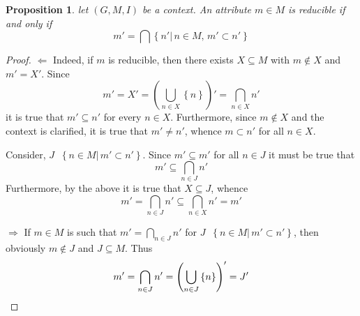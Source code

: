 \documentclass[a4paper]{article}
\newcommand{\obj}[1]{{\left\{ #1 \right \}}}
\newcommand{\brac}[1]{{\left ( #1 \right )}}
\newcommand{\induc}[1]{{\left . #1 \right \vert}}
\newtheorem{prop}{Proposition}
\newcommand{\defn}{\mathop{\overset{\Delta}{=}}\nolimits}
\begin{document}
\begin{prop} let $(G,M,I)$ be a context. An attribute $m\in M$ is reducible if and only if \[m' = \bigcap \obj{\induc{n'}\,n\in M,\,m'\subset n'}\]
\end{prop}

\begin{proof}
$\Leftarrow$ Indeed, if $m$ is reducible, then there exists $X\subseteq M$ with $m\notin X$ and $m'=X'$. Since \[m' = X' = \brac{\bigcup_{n\in X} \obj{n}}' = \bigcap_{n\in X} n'\] it is true that $m'\subseteq n'$ for every $n\in X$. Furthermore, since $m\notin X$ and the context is clarified, it is true that $m'\neq n'$, whence $m\subset n'$ for all $n\in X$.

Consider, $J\defn \obj{\induc{n\in M}\,m'\subset n'}$. Since $m'\subseteq m'$ for all $n\in J$ it must be true that \[m'\subseteq \bigcap_{n\in J} n'\] Furthermore, by the above it is true that $X\subseteq J$, whence \[m' = \bigcap_{n\in J} n' \subseteq \bigcap_{n\in X} n' = m'\]

$\Rightarrow$ If $m\in M$ is such that $m'=\bigcap_{n\in J} n'$ for $J\defn \obj{\induc{n\in M}\, m'\subset n'}$, then obviously $m\notin J$ and $J\subseteq M$. Thus \[m' = \bigcap_{n\in J} n' = \brac{\bigcup_{n\in J} \obj{n}}' = J' \qedhere\]

\end{proof}








\end{document}
